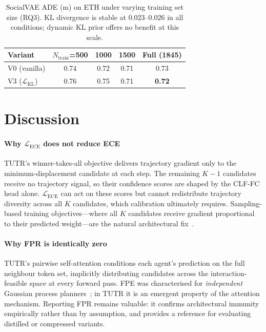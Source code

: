 \documentclass[journal,letterpaper]{IEEEtran}
\begin{document}

\begin{table}[t]
\caption{SocialVAE ADE (m) on ETH under varying training set size
  (RQ3). KL divergence is stable at $0.023$--$0.026$ in all
  conditions; dynamic KL prior offers no benefit at this scale.}
\label{tab:socialvae}
\centering
\setlength{\tabcolsep}{6pt}
\begin{tabular}{l c c c c}
\toprule
Variant & $N_\text{train}$=500 & 1000 & 1500 & Full (1845) \\
\midrule
V0 (vanilla) & 0.74 & 0.72 & 0.71 & 0.73 \\
V3 ($\mathcal{L}_\text{KL}$) & 0.76 & 0.75 & 0.71 & \textbf{0.72} \\
\bottomrule
\end{tabular}
\end{table}

\section{Discussion}
\label{sec:discussion}

\paragraph{Why $\mathcal{L}_{\text{ECE}}$ does not reduce ECE}
TUTR's winner-takes-all objective delivers trajectory gradient only to
the minimum-displacement candidate at each step.
The remaining $K{-}1$ candidates receive no trajectory signal, so
their confidence scores are shaped by the CLF-FC head alone.
$\mathcal{L}_{\text{ECE}}$ can act on these scores but cannot
redistribute trajectory diversity across all $K$ candidates, which
calibration ultimately requires.
Sampling-based training objectives---where all $K$ candidates receive
gradient proportional to their predicted weight---are the natural
architectural fix~\cite{karandikar2021soft}.

\paragraph{Why FPR is identically zero}
TUTR's pairwise self-attention conditions each agent's prediction on
the full neighbour token set, implicitly distributing candidates
across the interaction-feasible space at every forward pass.
FPE was characterised for \emph{independent} Gaussian process
planners~\cite{trautman2010unfreezing}; in TUTR it is an emergent
property of the attention mechanism.
Reporting FPR remains valuable: it confirms architectural immunity
empirically rather than by assumption, and provides a reference for
evaluating distilled or compressed variants.
\end{document}
